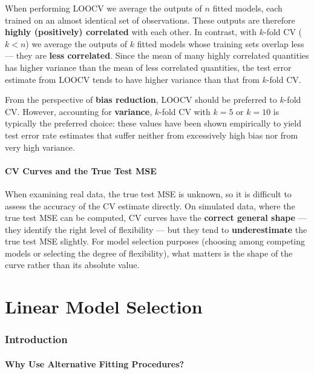 \documentclass[11pt,a4paper]{article}
\theoremstyle{definition}
\theoremstyle{plain}
\theoremstyle{remark}
\begin{document}
When performing LOOCV we average the outputs of $n$ fitted models, each trained on an almost identical set of observations. These outputs are therefore \textbf{highly (positively) correlated} with each other. In contrast, with $k$-fold CV ($k < n$) we average the outputs of $k$ fitted models whose training sets overlap less — they are \textbf{less correlated}. Since the mean of many highly correlated quantities has higher variance than the mean of less correlated quantities, the test error estimate from LOOCV tends to have higher variance than that from $k$-fold CV.

\begin{tcolorbox}[colback=green!5!white,colframe=green!75!black]
From the perspective of \textbf{bias reduction}, LOOCV should be preferred to $k$-fold CV. However, accounting for \textbf{variance}, $k$-fold CV with $k = 5$ or $k = 10$ is typically the preferred choice: these values have been shown empirically to yield test error rate estimates that suffer neither from excessively high bias nor from very high variance.
\end{tcolorbox}

\subsection{CV Curves and the True Test MSE}

When examining real data, the true test MSE is unknown, so it is difficult to assess the accuracy of the CV estimate directly. On simulated data, where the true test MSE can be computed, CV curves have the \textbf{correct general shape} — they identify the right level of flexibility — but they tend to \textbf{underestimate} the true test MSE slightly. For model selection purposes (choosing among competing models or selecting the degree of flexibility), what matters is the shape of the curve rather than its absolute value.


\part{Linear Model Selection}

\section{Introduction}

\subsection{Why Use Alternative Fitting Procedures?}
\end{document}
